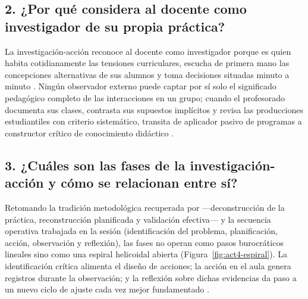 \documentclass[spanish,letterpaper,oneside]{article}
\begin{document}
\subsection*{2. ¿Por qué considera al docente como investigador de su propia práctica?}
La investigación-acción reconoce al docente como investigador porque es quien habita cotidianamente las tensiones curriculares, escucha de primera mano las concepciones alternativas de sus alumnos y toma decisiones situadas minuto a minuto \citep{restrepo2004investigacion}. Ningún observador externo puede captar por sí solo el significado pedagógico completo de las interacciones en un grupo; cuando el profesorado documenta sus clases, contrasta sus supuestos implícitos y revisa las producciones estudiantiles con criterio sistemático, transita de aplicador pasivo de programas a constructor crítico de conocimiento didáctico \citep{sawyer2008optimizing}.

\subsection*{3. ¿Cuáles son las fases de la investigación-acción y cómo se relacionan entre sí?}
Retomando la tradición metodológica recuperada por \citet{restrepo2004investigacion} —deconstrucción de la práctica, reconstrucción planificada y validación efectiva— y la secuencia operativa trabajada en la sesión (identificación del problema, planificación, acción, observación y reflexión), las fases no operan como pasos burocráticos lineales sino como una espiral helicoidal abierta (Figura~\ref{fig:act4-espiral}). La identificación crítica alimenta el diseño de acciones; la acción en el aula genera registros durante la observación; y la reflexión sobre dichas evidencias da paso a un nuevo ciclo de ajuste cada vez mejor fundamentado \citep{pimienta2012metodologia}.
\end{document}
